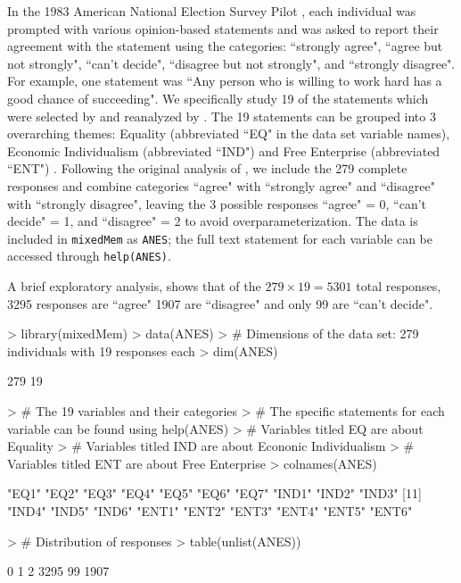 \documentclass{article}
\begin{document}
In the 1983 American National Election Survey Pilot \citep{ANES}, each individual was prompted with various opinion-based statements and was asked to report their agreement with the statement using the categories: ``strongly agree", ``agree but not strongly", ``can't decide", ``disagree but not strongly", and ``strongly disagree". For example, one statement was ``Any person who is willing to work hard has a good chance of succeeding". We specifically study 19 of the statements which were selected by \cite{feldman1988structure} and reanalyzed by \citep{grossManriqueVallier}.  The 19 statements can be grouped into 3 overarching themes: Equality (abbreviated ``EQ" in the data set variable names), Economic Individualism (abbreviated ``IND") and Free Enterprise (abbreviated ``ENT") \citep{feldman1988structure}.  Following the original analysis of \cite{grossManriqueVallier}, we include the 279 complete responses and combine categories ``agree" with ``strongly agree" and ``disagree"  with ``strongly disagree", leaving the 3 possible responses ``agree" = 0, ``can't decide" = 1, and ``disagree" = 2 to avoid overparameterization. The data is included in \texttt{mixedMem} as \texttt{ANES}; the full text statement for each variable can be accessed through \texttt{help(ANES)}. 

A brief exploratory analysis, shows that of the $279 \times 19 = 5301$ total responses, 3295 responses are ``agree" 1907 are ``disagree" and only 99 are ``can't decide".


\begin{Schunk}
\begin{Sinput}
> library(mixedMem)
> data(ANES)
> # Dimensions of the data set: 279 individuals with 19 responses each
> dim(ANES)
\end{Sinput}
\begin{Soutput}
[1] 279  19
\end{Soutput}
\begin{Sinput}
> # The 19 variables and their categories
> # The specific statements for each variable can be found using help(ANES)
> # Variables titled EQ are about Equality
> # Variables titled IND are about Econonic Individualism
> # Variables titled ENT are about Free Enterprise
> colnames(ANES)
\end{Sinput}
\begin{Soutput}
 [1] "EQ1"  "EQ2"  "EQ3"  "EQ4"  "EQ5"  "EQ6"  "EQ7"  "IND1" "IND2" "IND3"
[11] "IND4" "IND5" "IND6" "ENT1" "ENT2" "ENT3" "ENT4" "ENT5" "ENT6"
\end{Soutput}
\begin{Sinput}
> # Distribution of responses
> table(unlist(ANES))
\end{Sinput}
\begin{Soutput}
   0    1    2 
3295   99 1907 
\end{Soutput}
\end{Schunk}
\end{document}
